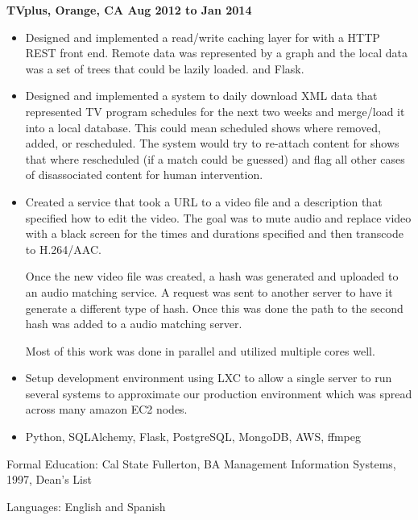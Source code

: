 \documentclass{res}
\begin{document}
\begin{resume}
  {\large \bf TVplus, Orange, CA \hfill Aug 2012 to Jan 2014}

  \begin{itemize}

  \item
    Designed and implemented a read/write caching layer for with a
    HTTP REST front end.
    Remote data was represented by a graph and the
    local data was a set of trees that could be lazily loaded. 
    and Flask.

  \item
    Designed and implemented a system to daily download XML data
    that represented TV program schedules for the next two weeks and
    merge/load it into a local database.  This could mean scheduled
    shows where removed, added, or rescheduled.  The system would try
    to re-attach content for shows that where rescheduled (if a match
    could be guessed) and flag all other cases of disassociated content
    for human intervention.

  \item
    Created a service that took a URL to a video file and a description
    that specified how to edit the video.  The goal was to mute audio
    and replace video with a black screen for the times and durations
    specified and then transcode to H.264/AAC.

    Once the new video file was created, a hash was generated and uploaded
    to an audio matching service. A request was sent to another server
    to have it generate a different type of hash.  Once this was done
    the path to the second hash was added to a audio matching server.

    Most of this work was done in parallel and utilized multiple cores
    well.

  \item
    Setup development environment using LXC to allow a single server to
    run several systems to approximate our production environment which
    was spread across many amazon EC2 nodes.

  \item
    Python, SQLAlchemy, Flask, PostgreSQL, MongoDB, AWS, ffmpeg

  \end{itemize}

  Formal Education: Cal State Fullerton, BA Management Information
  Systems, 1997, Dean's List

  Languages: English and Spanish

\end{resume}
\end{document}
